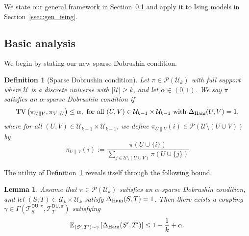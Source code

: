 \documentclass[11pt]{article}
\newtheorem{lemma}{Lemma}
\newtheorem{definition}{Definition}
\newcommand{\defeq}{:=}
\newcommand{\1}{\mathbf{1}}
\newcommand{\0}{\mathbf{0}}
\newcommand{\E}{\mathbb{E}}
\newcommand{\dham}{\Delta_{\textup{Ham}}}
\newcommand{\Brack}[1]{\left[#1\right]}
\newcommand{\TV}[1]{\mathrm{TV}\left(#1\right)}
\newcommand{\calP}{{\mathcal{P}}}
\newcommand{\calT}{{\mathcal{T}}}
\newcommand{\calU}{{\mathcal{U}}}
\newcommand{\TDU}[1]{\calT^{\mathsf{DU}, #1}}
\begin{document}
We state our general framework in Section~\ref{ssec:basic_sparse} and apply it to Ising models in Section~\ref{ssec:gen_ising}.

\subsection{Basic analysis}\label{ssec:basic_sparse}

We begin by stating our new sparse Dobrushin condition.

\begin{definition}[Sparse Dobrushin condition]
    \label{def:sparse_dobrushin}
Let $\pi \in \calP(\calU_k)$ with full support where $\calU$ is a discrete universe with $|\calU| \ge k$, and let $\alpha \in (0, 1)$. We say $\pi$ satisfies an \emph{$\alpha$-sparse Dobrushin condition} if
\[\TV{\pi_{U \| V}, \pi_{V \| U}} \le \alpha,\text{ for all } (U, V) \in \calU_{k - 1} \times \calU_{k - 1} \text{ with } \dham(U, V) = 1, \]
where for all $(U, V) \in \calU_{k - 1} \times \calU_{k - 1}$, we define $\pi_{U \| V}(i) \in \calP(\calU \setminus (U \cup V))$ by
\begin{equation}\label{eq:piuv_def}
\pi_{U \| V}(i) \defeq \frac{\pi(U \cup \{i\})}{\sum_{j \in \calU \setminus (U \cup V)} \pi(U \cup \{j\})}
\end{equation}
\end{definition}

The utility of Definition~\ref{def:sparse_dobrushin} reveals itself through the following bound.

\begin{lemma}
\label{lem:du_coupling}
Assume that $\pi \in \calP(\calU_k)$ satisfies an $\alpha$-sparse Dobrushin condition, and let $(S, T) \in \calU_{k} \times \calU_{k}$ satisfy $\dham(S, T) = 1$. Then there exists a coupling $\gamma \in \Gamma(\TDU{\pi}_S, \TDU{\pi}_T)$ satisfying
\[\E_{(S', T') \sim \gamma}\Brack{\dham(S', T')} \le 1 - \frac 1 k + \alpha.\]
\end{lemma}
\end{document}
